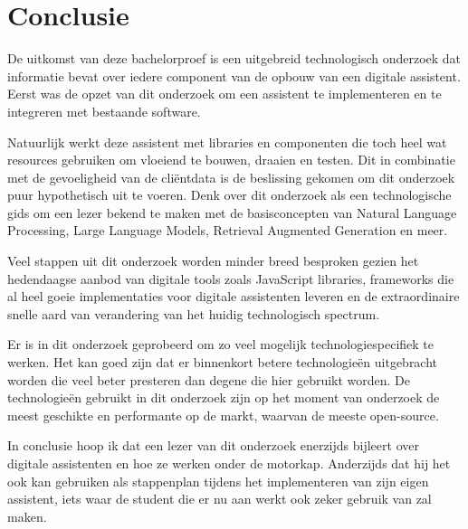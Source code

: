 
\chapter{Conclusie}%
\label{ch:conclusie}


De uitkomst van deze bachelorproef is een uitgebreid technologisch onderzoek dat informatie bevat over iedere component van de opbouw van een digitale assistent. 
Eerst was de opzet van dit onderzoek om een assistent te implementeren en te integreren met bestaande software. 

Natuurlijk werkt deze assistent met libraries en componenten die toch heel wat resources gebruiken om vloeiend te bouwen, draaien en testen. 
Dit in combinatie met de gevoeligheid van de cliëntdata is de beslissing gekomen om dit onderzoek puur hypothetisch uit te voeren. 
Denk over dit onderzoek als een technologische gids om een lezer bekend te maken met de basisconcepten van Natural Language Processing, Large Language Models, Retrieval Augmented Generation en meer. 

Veel stappen uit dit onderzoek worden minder breed besproken gezien het hedendaagse aanbod van digitale tools zoals JavaScript libraries, 
frameworks die al heel goeie implementaties voor digitale assistenten leveren en de extraordinaire snelle aard van verandering van het huidig technologisch spectrum. 

Er is in dit onderzoek geprobeerd om zo veel mogelijk technologiespecifiek te werken. 
Het kan goed zijn dat er binnenkort betere technologieën uitgebracht worden die veel beter presteren dan degene die hier gebruikt worden. 
De technologieën gebruikt in dit onderzoek zijn op het moment van onderzoek de meest geschikte en performante op de markt, waarvan de meeste open-source. 

In conclusie hoop ik dat een lezer van dit onderzoek enerzijds bijleert over digitale assistenten en hoe ze werken onder de motorkap. 
Anderzijds dat hij het ook kan gebruiken als stappenplan tijdens het implementeren van zijn eigen assistent, iets waar de student die er nu aan werkt ook zeker gebruik van zal maken. 
